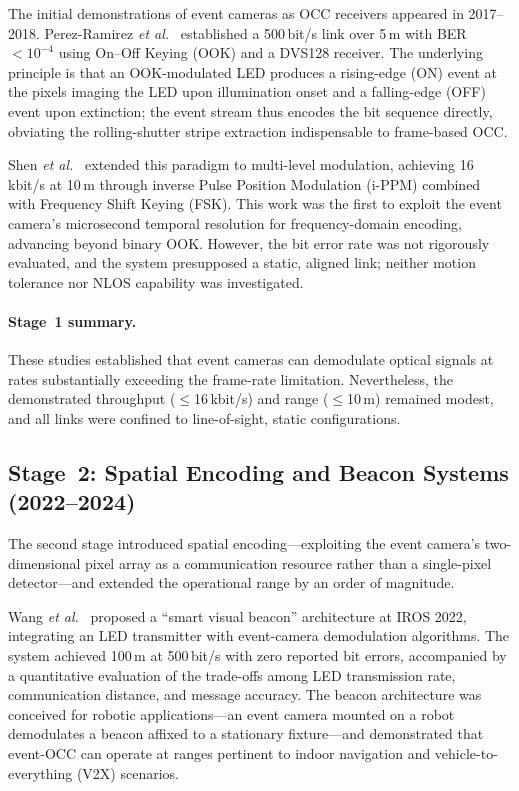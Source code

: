 \documentclass[10pt,a4paper]{article}
\newcommand{\stage}[1]{\textbf{Stage~#1}}
\begin{document}
The initial demonstrations of event cameras as OCC receivers appeared in
2017--2018. Perez-Ramirez \emph{et al.}~\cite{perez2017eventocc}
established a 500\,bit/s link over 5\,m with BER $<10^{-4}$ using
On--Off Keying (OOK) and a DVS128 receiver. The underlying principle is
that an OOK-modulated LED produces a rising-edge (ON) event at the
pixels imaging the LED upon illumination onset and a falling-edge (OFF)
event upon extinction; the event stream thus encodes the bit sequence
directly, obviating the rolling-shutter stripe extraction indispensable
to frame-based OCC.

Shen \emph{et al.}~\cite{shen2018eventocc} extended this paradigm to
multi-level modulation, achieving 16\,kbit/s at 10\,m through inverse
Pulse Position Modulation (i-PPM) combined with Frequency Shift Keying
(FSK). This work was the first to exploit the event camera's
microsecond temporal resolution for frequency-domain encoding, advancing
beyond binary OOK. However, the bit error rate was not rigorously
evaluated, and the system presupposed a static, aligned link; neither
motion tolerance nor NLOS capability was investigated.

\paragraph{Stage~1 summary.}
These studies established that event cameras can demodulate optical
signals at rates substantially exceeding the frame-rate limitation.
Nevertheless, the demonstrated throughput ($\leq$16\,kbit/s) and range
($\leq$10\,m) remained modest, and all links were confined to
line-of-sight, static configurations.

\subsection{\stage{2}: Spatial Encoding and Beacon Systems (2022--2024)}
\label{sec:stage2}

The second stage introduced spatial encoding---exploiting the event
camera's two-dimensional pixel array as a communication resource rather
than a single-pixel detector---and extended the operational range by an
order of magnitude.

Wang \emph{et al.}~\cite{wang2022beacon} proposed a ``smart visual
beacon'' architecture at IROS 2022, integrating an LED transmitter with
event-camera demodulation algorithms. The system achieved 100\,m at
500\,bit/s with zero reported bit errors, accompanied by a quantitative
evaluation of the trade-offs among LED transmission rate, communication
distance, and message accuracy. The beacon architecture was conceived
for robotic applications---an event camera mounted on a robot
demodulates a beacon affixed to a stationary fixture---and demonstrated
that event-OCC can operate at ranges pertinent to indoor navigation and
vehicle-to-everything (V2X) scenarios.
\end{document}
